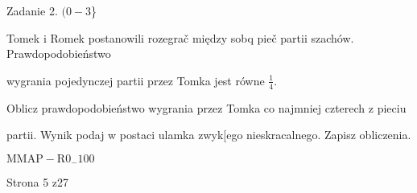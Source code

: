 \documentclass[a4paper,12pt]{article}
\begin{document}
Zadanie 2. $(0-3$\}

Tomek i Romek postanowili rozegrač między sobq pieč partii szachów. Prawdopodobieństwo

wygrania pojedynczej partii przez Tomka jest równe $\displaystyle \frac{1}{4}.$

Oblicz prawdopodobieństwo wygrania przez Tomka co najmniej czterech z pieciu

partii. Wynik podaj w postaci ulamka zwyk[ego nieskracalnego. Zapisz obliczenia.

$\mathrm{M}\mathrm{M}\mathrm{A}\mathrm{P}-\mathrm{R}0_{-}100$

Strona 5 z27
\end{document}
